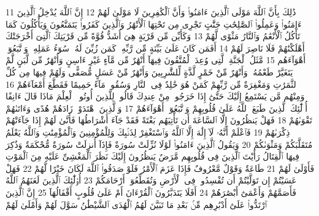 {\tiny\colorbox{cl_aya}{11}} ذَٰلِكَ بِأَنَّ ٱللَّهَ مَوْلَى ٱلَّذِينَ ءَامَنُوا۟ وَأَنَّ ٱلْكَٰفِرِينَ لَا مَوْلَىٰ لَهُمْ
{\tiny\colorbox{cl_aya}{12}} إِنَّ ٱللَّهَ يُدْخِلُ ٱلَّذِينَ ءَامَنُوا۟ وَعَمِلُوا۟ ٱلصَّٰلِحَٰتِ جَنَّٰتٍ تَجْرِى مِن تَحْتِهَا ٱلْأَنْهَٰرُ وَٱلَّذِينَ كَفَرُوا۟ يَتَمَتَّعُونَ وَيَأْكُلُونَ كَمَا تَأْكُلُ ٱلْأَنْعَٰمُ وَٱلنَّارُ مَثْوًى لَّهُمْ
{\tiny\colorbox{cl_aya}{13}} وَكَأَيِّن مِّن قَرْيَةٍ هِىَ أَشَدُّ قُوَّةً مِّن قَرْيَتِكَ ٱلَّتِىٓ أَخْرَجَتْكَ أَهْلَكْنَٰهُمْ فَلَا نَاصِرَ لَهُمْ
{\tiny\colorbox{cl_aya}{14}} أَفَمَن كَانَ عَلَىٰ بَيِّنَةٍ مِّن رَّبِّهِۦ كَمَن زُيِّنَ لَهُۥ سُوٓءُ عَمَلِهِۦ وَٱتَّبَعُوٓا۟ أَهْوَآءَهُم
{\tiny\colorbox{cl_aya}{15}} مَّثَلُ ٱلْجَنَّةِ ٱلَّتِى وُعِدَ ٱلْمُتَّقُونَ فِيهَآ أَنْهَٰرٌ مِّن مَّآءٍ غَيْرِ ءَاسِنٍ وَأَنْهَٰرٌ مِّن لَّبَنٍ لَّمْ يَتَغَيَّرْ طَعْمُهُۥ وَأَنْهَٰرٌ مِّنْ خَمْرٍ لَّذَّةٍ لِّلشَّٰرِبِينَ وَأَنْهَٰرٌ مِّنْ عَسَلٍ مُّصَفًّى وَلَهُمْ فِيهَا مِن كُلِّ ٱلثَّمَرَٰتِ وَمَغْفِرَةٌ مِّن رَّبِّهِمْ كَمَنْ هُوَ خَٰلِدٌ فِى ٱلنَّارِ وَسُقُوا۟ مَآءً حَمِيمًا فَقَطَّعَ أَمْعَآءَهُمْ
{\tiny\colorbox{cl_aya}{16}} وَمِنْهُم مَّن يَسْتَمِعُ إِلَيْكَ حَتَّىٰٓ إِذَا خَرَجُوا۟ مِنْ عِندِكَ قَالُوا۟ لِلَّذِينَ أُوتُوا۟ ٱلْعِلْمَ مَاذَا قَالَ ءَانِفًا أُو۟لَٰٓئِكَ ٱلَّذِينَ طَبَعَ ٱللَّهُ عَلَىٰ قُلُوبِهِمْ وَٱتَّبَعُوٓا۟ أَهْوَآءَهُمْ
{\tiny\colorbox{cl_aya}{17}} وَٱلَّذِينَ ٱهْتَدَوْا۟ زَادَهُمْ هُدًى وَءَاتَىٰهُمْ تَقْوَىٰهُمْ
{\tiny\colorbox{cl_aya}{18}} فَهَلْ يَنظُرُونَ إِلَّا ٱلسَّاعَةَ أَن تَأْتِيَهُم بَغْتَةً فَقَدْ جَآءَ أَشْرَاطُهَا فَأَنَّىٰ لَهُمْ إِذَا جَآءَتْهُمْ ذِكْرَىٰهُمْ
{\tiny\colorbox{cl_aya}{19}} فَٱعْلَمْ أَنَّهُۥ لَآ إِلَٰهَ إِلَّا ٱللَّهُ وَٱسْتَغْفِرْ لِذَنۢبِكَ وَلِلْمُؤْمِنِينَ وَٱلْمُؤْمِنَٰتِ وَٱللَّهُ يَعْلَمُ مُتَقَلَّبَكُمْ وَمَثْوَىٰكُمْ
{\tiny\colorbox{cl_aya}{20}} وَيَقُولُ ٱلَّذِينَ ءَامَنُوا۟ لَوْلَا نُزِّلَتْ سُورَةٌ فَإِذَآ أُنزِلَتْ سُورَةٌ مُّحْكَمَةٌ وَذُكِرَ فِيهَا ٱلْقِتَالُ رَأَيْتَ ٱلَّذِينَ فِى قُلُوبِهِم مَّرَضٌ يَنظُرُونَ إِلَيْكَ نَظَرَ ٱلْمَغْشِىِّ عَلَيْهِ مِنَ ٱلْمَوْتِ فَأَوْلَىٰ لَهُمْ
{\tiny\colorbox{cl_aya}{21}} طَاعَةٌ وَقَوْلٌ مَّعْرُوفٌ فَإِذَا عَزَمَ ٱلْأَمْرُ فَلَوْ صَدَقُوا۟ ٱللَّهَ لَكَانَ خَيْرًا لَّهُمْ
{\tiny\colorbox{cl_aya}{22}} فَهَلْ عَسَيْتُمْ إِن تَوَلَّيْتُمْ أَن تُفْسِدُوا۟ فِى ٱلْأَرْضِ وَتُقَطِّعُوٓا۟ أَرْحَامَكُمْ
{\tiny\colorbox{cl_aya}{23}} أُو۟لَٰٓئِكَ ٱلَّذِينَ لَعَنَهُمُ ٱللَّهُ فَأَصَمَّهُمْ وَأَعْمَىٰٓ أَبْصَٰرَهُمْ
{\tiny\colorbox{cl_aya}{24}} أَفَلَا يَتَدَبَّرُونَ ٱلْقُرْءَانَ أَمْ عَلَىٰ قُلُوبٍ أَقْفَالُهَآ
{\tiny\colorbox{cl_aya}{25}} إِنَّ ٱلَّذِينَ ٱرْتَدُّوا۟ عَلَىٰٓ أَدْبَٰرِهِم مِّنۢ بَعْدِ مَا تَبَيَّنَ لَهُمُ ٱلْهُدَى ٱلشَّيْطَٰنُ سَوَّلَ لَهُمْ وَأَمْلَىٰ لَهُمْ
